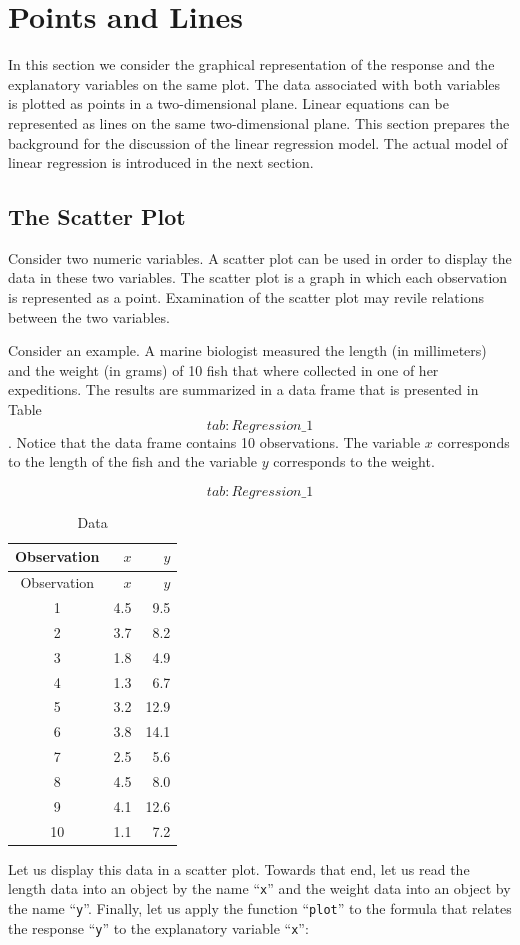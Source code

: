 \documentclass[]{krantz}
\theoremstyle{definition}
\theoremstyle{definition}
\theoremstyle{definition}
\theoremstyle{remark}
\begin{document}
\hypertarget{points-and-lines}{%
\section{Points and Lines}\label{points-and-lines}}

In this section we consider the graphical representation of the response
and the explanatory variables on the same plot. The data associated with
both variables is plotted as points in a two-dimensional plane. Linear
equations can be represented as lines on the same two-dimensional plane.
This section prepares the background for the discussion of the linear
regression model. The actual model of linear regression is introduced in
the next section.

\hypertarget{the-scatter-plot}{%
\subsection{The Scatter Plot}\label{the-scatter-plot}}

Consider two numeric variables. A scatter plot can be used in order to
display the data in these two variables. The scatter plot is a graph in
which each observation is represented as a point. Examination of the
scatter plot may revile relations between the two variables.

Consider an example. A marine biologist measured the length (in
millimeters) and the weight (in grams) of 10 fish that where collected
in one of her expeditions. The results are summarized in a data frame
that is presented in Table~\[tab:Regression\_1\]. Notice that the data
frame contains 10 observations. The variable \(x\) corresponds to the
length of the fish and the variable \(y\) corresponds to the weight.

\[tab:Regression\_1\]

\begin{longtable}[]{@{}crr@{}}
\caption{Data}\tabularnewline
\toprule
Observation & \(x\) & \(y\)\tabularnewline
\midrule
\endfirsthead
\toprule
Observation & \(x\) & \(y\)\tabularnewline
\midrule
\endhead
1 & 4.5 & 9.5\tabularnewline
2 & 3.7 & 8.2\tabularnewline
3 & 1.8 & 4.9\tabularnewline
4 & 1.3 & 6.7\tabularnewline
5 & 3.2 & 12.9\tabularnewline
6 & 3.8 & 14.1\tabularnewline
7 & 2.5 & 5.6\tabularnewline
8 & 4.5 & 8.0\tabularnewline
9 & 4.1 & 12.6\tabularnewline
10 & 1.1 & 7.2\tabularnewline
\bottomrule
\end{longtable}

Let us display this data in a scatter plot. Towards that end, let us
read the length data into an object by the name ``\texttt{x}'' and the weight
data into an object by the name ``\texttt{y}''. Finally, let us apply the
function ``\texttt{plot}'' to the formula that relates the response ``\texttt{y}'' to the
explanatory variable ``\texttt{x}'':
\end{document}
